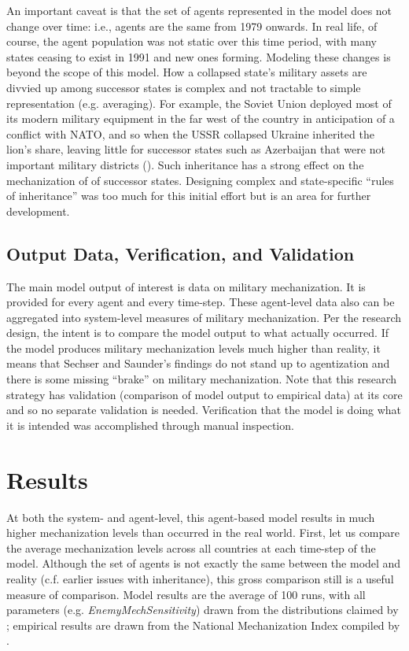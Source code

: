 \documentclass{article}
\begin{document}
An important caveat is that the set of agents represented in the model does not
change over time: i.e., agents are the same from 1979 onwards. In real life,
of course, the agent population was not static over this time period, with many
states ceasing to exist in 1991 and new ones forming. Modeling these changes is
beyond the scope of this model. How a collapsed state's military assets are divvied up
among successor states is complex and not tractable to simple representation
(e.g. averaging). For example, the Soviet Union deployed most of its modern
military equipment in the far west of the country in anticipation of a conflict
with NATO, and so when the USSR collapsed Ukraine inherited the lion's share, leaving
little for successor states such as Azerbaijan that were not important military
districts (\cite{roy1993military}). Such inheritance has
a strong effect on the mechanization of of successor states. Designing
complex and state-specific ``rules of inheritance'' was too much for this
initial effort but is an area for further development.

\subsection{Output Data, Verification, and Validation}

The main model output of interest is data on military mechanization. It is provided for
every agent and every time-step. These agent-level data also can be aggregated
into system-level measures of military mechanization. Per the research design,
the intent is to compare the model output to what actually occurred. If the
model produces military mechanization levels much higher than reality, it means
that Sechser and Saunder's findings do not stand up to agentization and there is
some missing ``brake'' on military mechanization. Note that this research
strategy has validation (comparison of model output to empirical data) at its
core and so no separate validation is needed. Verification that the model is
doing what it is intended was accomplished through manual inspection.

\section{Results}

At both the system- and agent-level, this agent-based model results in much
higher mechanization levels than occurred in the real world. First, let us
compare the average mechanization levels across all countries at each time-step
of the model. Although the set of agents is not exactly the same between the
model and reality (c.f. earlier issues with inheritance), this
gross comparison still is a useful measure of comparison. Model results are
the average of 100 runs, with all parameters (e.g.
\textit{EnemyMechSensitivity}) drawn from the distributions claimed by
\cite{sechser2010army}; empirical results are drawn from the National
Mechanization Index compiled by \cite{sechser2010army}.
\end{document}
